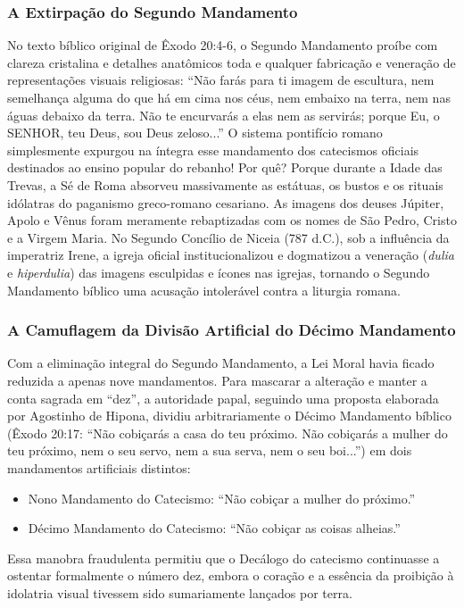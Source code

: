 \subsubsection*{A Extirpação do Segundo Mandamento}
No texto bíblico original de Êxodo 20:4-6, o Segundo Mandamento proíbe com clareza cristalina e detalhes anatômicos toda e qualquer fabricação e veneração de representações visuais religiosas: ``Não farás para ti imagem de escultura, nem semelhança alguma do que há em cima nos céus, nem embaixo na terra, nem nas águas debaixo da terra. Não te encurvarás a elas nem as servirás; porque Eu, o SENHOR, teu Deus, sou Deus zeloso...''
O sistema pontifício romano simplesmente expurgou na íntegra esse mandamento dos catecismos oficiais destinados ao ensino popular do rebanho! Por quê? Porque durante a Idade das Trevas, a Sé de Roma absorveu massivamente as estátuas, os bustos e os rituais idólatras do paganismo greco-romano cesariano. As imagens dos deuses Júpiter, Apolo e Vênus foram meramente rebaptizadas com os nomes de São Pedro, Cristo e a Virgem Maria. No Segundo Concílio de Niceia (787 d.C.), sob a influência da imperatriz Irene, a igreja oficial institucionalizou e dogmatizou a veneração (\textit{dulia} e \textit{hiperdulia}) das imagens esculpidas e ícones nas igrejas, tornando o Segundo Mandamento bíblico uma acusação intolerável contra a liturgia romana.


\subsubsection*{A Camuflagem da Divisão Artificial do Décimo Mandamento}
Com a eliminação integral do Segundo Mandamento, a Lei Moral havia ficado reduzida a apenas nove mandamentos. Para mascarar a alteração e manter a conta sagrada em ``dez'', a autoridade papal, seguindo uma proposta elaborada por Agostinho de Hipona, dividiu arbitrariamente o Décimo Mandamento bíblico (Êxodo 20:17: ``Não cobiçarás a casa do teu próximo. Não cobiçarás a mulher do teu próximo, nem o seu servo, nem a sua serva, nem o seu boi...'') em dois mandamentos artificiais distintos:
\begin{itemize}
  \item Nono Mandamento do Catecismo: ``Não cobiçar a mulher do próximo.''
  \item Décimo Mandamento do Catecismo: ``Não cobiçar as coisas alheias.''
\end{itemize}

Essa manobra fraudulenta permitiu que o Decálogo do catecismo continuasse a ostentar formalmente o número dez, embora o coração e a essência da proibição à idolatria visual tivessem sido sumariamente lançados por terra.



